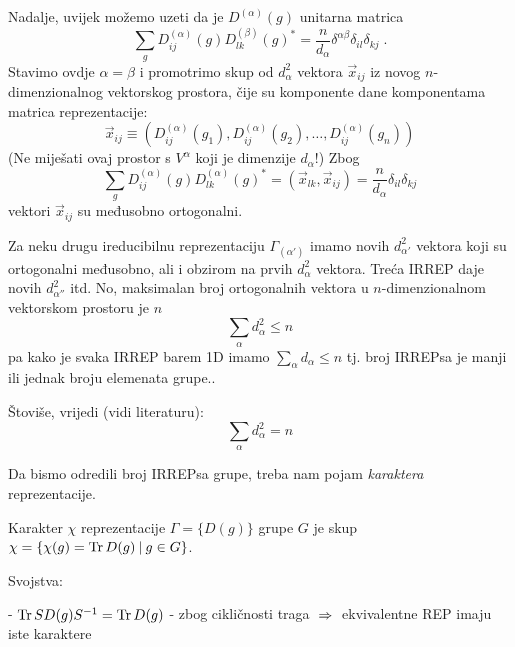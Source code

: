 Nadalje, uvijek možemo uzeti da je $D^{(\alpha)}(g)$ unitarna matrica
\begin{displaymath}
\sum_g D^{(\alpha)}_{ij}(g) D^{(\beta)}_{lk}(g)^* =
 \frac{n}{d_{\alpha}}\delta^{\alpha\beta}\delta_{il}\delta_{kj} \;.
\end{displaymath}
Stavimo ovdje $\alpha=\beta$ i promotrimo skup od $d^{2}_\alpha$ vektora
$\vec{x}_{ij}$ iz novog $n$-dimenzionalnog vektorskog prostora,  čije
su komponente dane komponentama matrica reprezentacije:
\begin{displaymath}
\vec{x}_{ij} \equiv
(D^{(\alpha)}_{ij}(g_1), D^{(\alpha)}_{ij}(g_2), \ldots, 
D^{(\alpha)}_{ij}(g_n))
\end{displaymath}
(Ne miješati ovaj
prostor s $V^{\alpha}$ koji je dimenzije $d_\alpha$!) Zbog
\begin{displaymath}
\sum_g D^{(\alpha)}_{ij}(g) D^{(\alpha)}_{lk}(g)^* = (\vec{x}_{lk},\vec{x}_{ij})
 =\frac{n}{d_{\alpha}}\delta_{il}\delta_{kj}
\end{displaymath}
vektori $\vec{x}_{ij}$ su međusobno ortogonalni.

Za neku drugu ireducibilnu reprezentaciju 
$\Gamma_{(\alpha')}$ imamo novih $d_{\alpha'}^{2}$
vektora  koji su ortogonalni međusobno, ali i obzirom na prvih
$d_{\alpha}^{2}$ vektora. Treća IRREP daje novih $d_{\alpha''}^{2}$ itd.
No, maksimalan broj ortogonalnih vektora u $n$-dimenzionalnom vektorskom
prostoru je $n$ 
\begin{displaymath}
\sum_{\alpha} d_{\alpha}^{2} \leq n  
\end{displaymath}
pa kako je svaka IRREP barem 1D imamo $\sum_{\alpha} d_\alpha \leq n$ tj.
broj IRREPsa je manji ili jednak broju elemenata grupe..

Štoviše, vrijedi (vidi literaturu):
\begin{displaymath}
\sum_{\alpha} d_{\alpha}^2 = n
\end{displaymath}

Da bismo odredili broj IRREPsa grupe, treba nam pojam \emph{karaktera}
reprezentacije.

\begin{definicija}
Karakter $\chi$ reprezentacije $\Gamma=\{D(g)\}$ grupe $G$ je skup
$\chi=\{\chi(g) = \operatorname{Tr} D(g) \: | \:  g\in G\}$.
\end{definicija}

Svojstva:

- $\operatorname{Tr} S D(g) S^{-1} = \operatorname{Tr} D(g)$ - zbog cikličnosti traga
  $\;\Rightarrow\;$ ekvivalentne REP imaju iste karaktere

